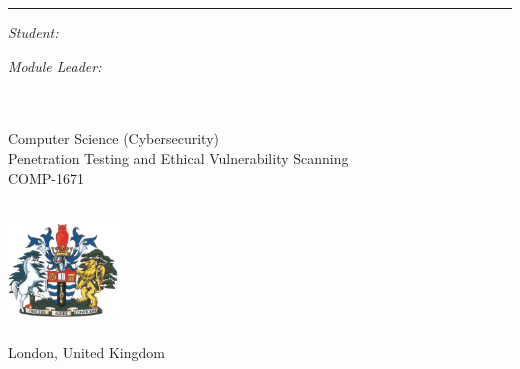 \begin{titlepage}
  \doublespacing{}
  \large
  \hfill
  \vfill
  \vspace*{0.5cm}
  \begin{center}
    \doublespacing{}
    \textcolor{Blue}{\huge\textbf{\myTitle}}
  \end{center}
  \vspace{1.25cm}
  \hrule
  \vspace{1.5cm}
  \onehalfspacing{}
  \begin{center}

    \begin{minipage}[t]{0.5\textwidth}
      \begin{flushleft}
        \emph{Student:}\\
        \href{\myWebsite}{{\myFirstName} \textsc{\myLastName}}
      \end{flushleft}
    \end{minipage}
    \begin{minipage}[t]{0.4\textwidth}
      \begin{flushright}
        \emph{Module Leader:} \\
        \href{\myProfWebsite}{{\myProfTitle} {\myProfFirstName} \textsc{\myProfLastName}}\\
      \end{flushright}
    \end{minipage}\\[1.5cm]

    Computer Science (Cybersecurity)\\
    Penetration Testing and Ethical Vulnerability Scanning\\
    {COMP-1671}\\[1cm]

    \myDepartment\\
    \myFaculty{}

    \hfill
    \vfill

    \includegraphics[width=3cm]{../shared/greenwich-coat-of-arms}\\
    \href{https://www.gre.ac.uk/}{\myUni}\\
    London, United Kingdom\\[2em]
    {\mySubmissionMonth} {\mySubmissionYear}
  \end{center}
\end{titlepage}
